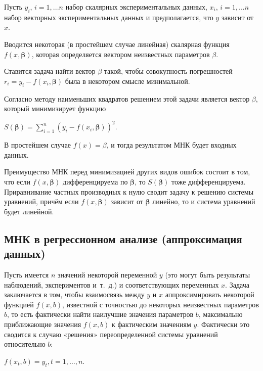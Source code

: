 \documentclass[a4paper]{article}
\begin{document}
{{{{{{{{Пусть {{\(y_{i}\)}}, {{\(i = 1,...n\)}} набор скалярных
экспериментальных данных, {{\(x_{i}\)}}, {{\(i = 1,...n\)}} набор
векторных экспериментальных данных и предполагается, что {{\(y\)}}
зависит от {{\(x\)}}.

Вводится некоторая (в простейшем случае линейная) скалярная функция
{{\(f(x,\mathbf{\beta})\)}}, которая определяется вектором неизвестных
параметров {{\(\beta\)}}.

Ставится задача найти вектор {{\(\beta\)}} такой, чтобы совокупность
погрешностей {{\(r_{i} = y_{i} - f(x_{i},\mathbf{\beta})\)}} была в
некотором смысле минимальной.

Согласно методу наименьших квадратов решением этой задачи является
вектор {{\(\beta\)}}, который минимизирует функцию

\begin{center}
 {{\(S(\mathbf{\beta}) = \sum\limits_{i = 1}^{n}(y_{i} - f(x_{i},\mathbf{\beta}))^{2}.\)}}
\end{center}

В простейшем случае {{\(f(x) = \beta\)}}, и тогда результатом МНК будет
входных данных.

Преимущество МНК перед минимизацией других видов ошибок состоит в том,
что если {{\(f(x,\mathbf{\beta})\)}} дифференцируема по
{{\(\mathbf{\beta}\)}}, то {{\(S(\mathbf{\beta})\)}} тоже
дифференцируема. Приравнивание частных производных к нулю сводит задачу
к решению системы уравнений, причём если {{\(f(x,\mathbf{\beta})\)}}
зависит от {{\(\mathbf{\beta}\)}} линейно, то и система уравнений будет
линейной.

\subsection{МНК в регрессионном анализе (аппроксимация данных)}

Пусть имеется {{\(n\)}} значений некоторой переменной {{\(y\)}} (это
могут быть результаты наблюдений, экспериментов и~т.~д.) и
соответствующих переменных {{\(x\)}}. Задача заключается в том, чтобы
взаимосвязь между {{\(y\)}} и {{\(x\)}} аппроксимировать некоторой
функцией {{\(f(x,b)\)}}, известной с точностью до некоторых неизвестных
параметров {{\(b\)}}, то есть фактически найти наилучшие значения
параметров {{\(b\)}}, максимально приближающие значения {{\(f(x,b)\)}} к
фактическим значениям {{\(y\)}}. Фактически это сводится к случаю
«решения» переопределенной системы уравнений относительно {{\(b\)}}:

\begin{center}
 {{\(f(x_{t},b) = y_{t},t = 1,\ldots,n\)}}.
\end{center}


}}}}}}}}
\end{document}
